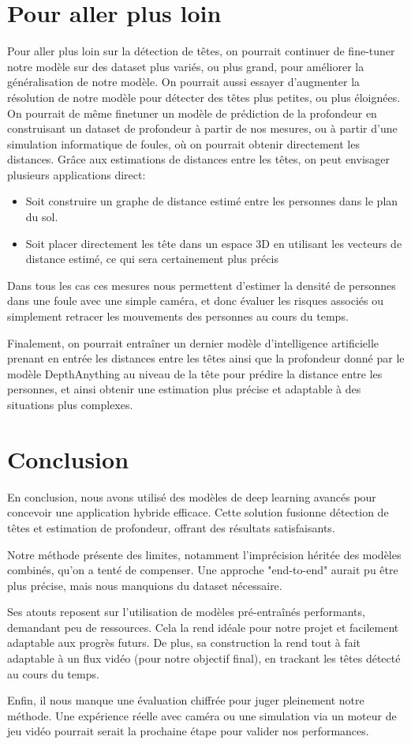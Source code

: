 \section{Pour aller plus loin}

Pour aller plus loin sur la détection de têtes, on pourrait continuer de fine-tuner notre modèle sur des dataset plus variés, ou plus grand, pour améliorer la généralisation de notre modèle. On pourrait aussi essayer d'augmenter la résolution de notre modèle pour détecter des têtes plus petites, ou plus éloignées.
On pourrait de même finetuner un modèle de prédiction de la profondeur en construisant un dataset de profondeur à partir de nos mesures, ou à partir d'une simulation informatique de foules, où on pourrait obtenir directement les distances.
Grâce aux estimations de distances entre les têtes, on peut envisager plusieurs applications direct:

\begin{itemize}
    \item Soit construire un graphe de distance estimé entre les personnes dans le plan du sol.
    \item Soit placer directement les tête dans un espace 3D en utilisant les vecteurs de distance estimé, ce qui sera certainement plus précis 
\end{itemize}

Dans tous les cas ces mesures nous permettent d'estimer la densité de personnes dans une foule avec une simple caméra, et donc évaluer les risques associés ou simplement retracer les mouvements des personnes au cours du temps.

Finalement, on pourrait entraîner un dernier modèle d'intelligence artificielle prenant en entrée les distances entre les têtes ainsi que la profondeur donné par le modèle DepthAnything au niveau de la tête pour prédire la distance entre les personnes, et ainsi obtenir une estimation plus précise et adaptable à des situations plus complexes.
\section{Conclusion}

En conclusion, nous avons utilisé des modèles de deep learning avancés pour concevoir une application hybride efficace. Cette solution fusionne détection de têtes et estimation de profondeur, offrant des résultats satisfaisants.

Notre méthode présente des limites, notamment l’imprécision héritée des modèles combinés, qu’on a tenté de compenser. Une approche "end-to-end" aurait pu être plus précise, mais nous manquions du dataset nécessaire.

Ses atouts reposent sur l’utilisation de modèles pré-entraînés performants, demandant peu de ressources. Cela la rend idéale pour notre projet et facilement adaptable aux progrès futurs. De plus, sa construction la rend tout à fait adaptable à un flux vidéo (pour notre objectif final), en trackant les têtes détecté au cours du temps.

Enfin, il nous manque une évaluation chiffrée pour juger pleinement notre méthode. Une expérience réelle avec caméra ou une simulation via un moteur de jeu vidéo pourrait serait la prochaine étape pour valider nos performances.
